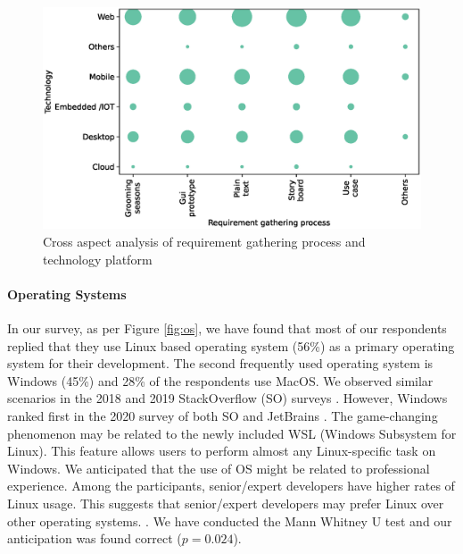 \begin{figure}[h]
\centering
  \includegraphics[scale=0.47]{Figures/Requirement_Technology_Cross_Analysis.eps}
  \caption{Cross aspect analysis of requirement gathering process and technology platform}
  \label{fig:requirement technology cross analysis}
\end{figure}



\paragraph{Operating Systems}
In our survey, as per Figure \ref{fig:os}, we have found that most of our respondents replied that they use Linux based operating system (56\%) as a primary operating system for their development. The second frequently used operating system is Windows (45\%) and 28\% of the respondents use MacOS. We observed similar scenarios in the 2018 and 2019 StackOverflow (SO) surveys \cite{StackoverflowSurvey2018,StackoverflowSurvey2019}. However, Windows ranked first in the 2020 survey of both SO and JetBrains \cite{StackoverflowSurvey2020, JetBrains2020}. The game-changing phenomenon may be related to the newly included WSL (Windows Subsystem for Linux). This feature allows users to perform almost any Linux-specific task on Windows. We anticipated that the use of OS might be related to professional experience. Among the participants, senior/expert developers have higher rates of Linux usage. This suggests that senior/expert developers may prefer Linux over other operating systems. . We have conducted the Mann Whitney U test and our anticipation was found correct ($p=0.024$). %

